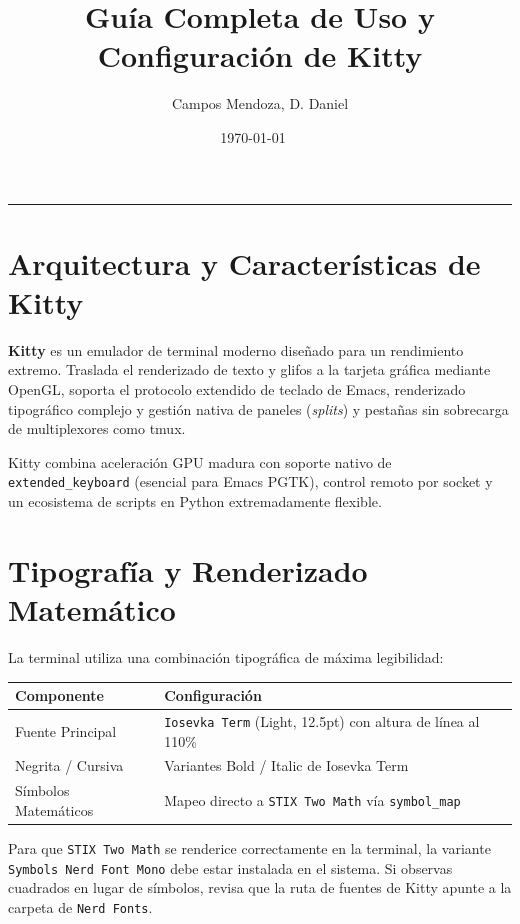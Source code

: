 \documentclass[11pt,article,spanish]{apuntes-scr}
\title[Emulador de Terminal Acelerado por GPU con Modus Vivendi Deuteranopia]{Guía Completa de Uso y Configuración de Kitty}
\author{Campos Mendoza, D. Daniel}
\date{\today\ \textperiodcentered\ \DTMcurrenttime}
\begin{document}
\maketitle
\tableofcontents
\vspace{1.5em}\hrule\vspace{1.5em}

\section{Arquitectura y Características de Kitty}
\textbf{Kitty} es un emulador de terminal moderno diseñado para un rendimiento extremo. Traslada el renderizado de texto y glifos a la tarjeta gráfica mediante OpenGL, soporta el protocolo extendido de teclado de Emacs, renderizado tipográfico complejo y gestión nativa de paneles (\textit{splits}) y pestañas sin sobrecarga de multiplexores como tmux.

\begin{notabox}
  Kitty combina aceleración GPU madura con soporte nativo de \texttt{extended\_keyboard} (esencial para Emacs PGTK), control remoto por socket y un ecosistema de scripts en Python extremadamente flexible.
\end{notabox}

\section{Tipografía y Renderizado Matemático}
La terminal utiliza una combinación tipográfica de máxima legibilidad:

\begin{center}
\small
\begin{tabularx}{\linewidth}{l X}
\toprule
\textbf{Componente} & \textbf{Configuración} \\
\midrule
Fuente Principal & \texttt{Iosevka Term} (Light, 12.5pt) con altura de línea al 110\% \\
Negrita / Cursiva & Variantes Bold / Italic de Iosevka Term \\
Símbolos Matemáticos & Mapeo directo a \texttt{STIX Two Math} vía \texttt{symbol\_map} \\
\bottomrule
\end{tabularx}
\end{center}

\begin{warningbox}
  Para que \texttt{STIX Two Math} se renderice correctamente en la terminal, la variante \texttt{Symbols Nerd Font Mono} debe estar instalada en el sistema. Si observas cuadrados en lugar de símbolos, revisa que la ruta de fuentes de Kitty apunte a la carpeta de \texttt{Nerd Fonts}.
\end{warningbox}
\end{document}

